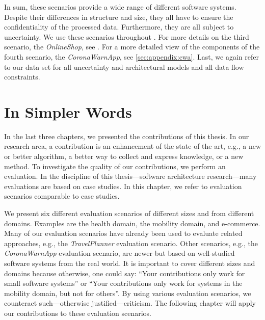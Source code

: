 In sum, these scenarios provide a wide range of different software systems.
Despite their differences in structure and size, they all have to ensure the confidentiality of the processed data.
Furthermore, they are all subject to uncertainty.
We use these scenarios throughout .
For more details on the third scenario, the \emph{OnlineShop}, see .
For a more detailed view of the components of the fourth scenario, the \emph{CoronaWarnApp}, see \autoref{sec:appendix:cwa}.
Last, we again refer to our data set \cite{dataset} for all uncertainty and architectural models and all data flow constraints.





\section{In Simpler Words}%
\label{sec:evaluationscenarios:simple}

In the last three chapters, we presented the contributions of this thesis.
In our research area, a contribution is an enhancement of the state of the art, e.g., a new or better algorithm, a better way to collect and express knowledge, or a new method.
To investigate the quality of our contributions, we perform an evaluation.
In the discipline of this thesis---software architecture research---many evaluations are based on case studies.
In this chapter, we refer to evaluation scenarios comparable to case studies.

We present six different evaluation scenarios of different sizes and from different domains.
Examples are the health domain, the mobility domain, and e-commerce.
Many of our evaluation scenarios have already been used to evaluate related approaches, e.g., the \emph{TravelPlanner} evaluation scenario.
Other scenarios, e.g., the \emph{CoronaWarnApp} evaluation scenario, are newer but based on well-studied software systems from the real world.
It is important to cover different sizes and domains because otherwise, one could say: \enquote{Your contributions only work for small software systems} or \enquote{Your contributions only work for systems in the mobility domain, but not for others}.
By using various evaluation scenarios, we counteract such---otherwise justified---criticism.
The following chapter will apply our contributions to these evaluation scenarios.
